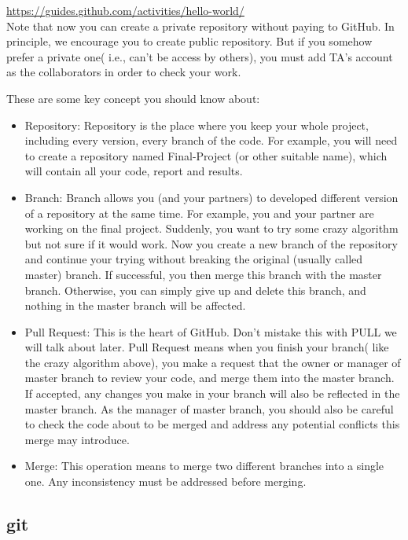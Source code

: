 \documentclass[12pt, fullpage,letterpaper]{article}
\begin{document}
\href{https://guides.github.com/activities/hello-world/}{https://guides.github.com/activities/hello-world/}\\

Note that now you can create a private repository without paying to GitHub. In principle, we encourage you to create public repository. But if you somehow prefer a private one( i.e., can't be access by others), you must add TA's account as the collaborators in order to check your work.  

These are some key concept you should know about:
\begin{itemize}
	\item Repository: Repository is the place where you keep your whole project, including every version, every branch of the code. For example, you will need to create a repository named Final-Project (or other suitable name), which will contain all your code, report and results.
	
	\item Branch: Branch allows you (and your partners) to developed different version of a repository at the same time. For example, you and your partner are working on the final project. Suddenly, you want to try some crazy algorithm but not sure if it would work. Now you create a new branch of the repository and continue your trying without breaking the original (usually called master) branch. If successful, you then merge this branch with the master branch. Otherwise, you can simply give up and delete this branch, and nothing in the master branch will be affected. 
	
	\item Pull Request: This is the heart of GitHub. Don't mistake this with PULL we will talk about later. Pull Request means when you finish your branch( like the crazy algorithm above), you make a request that the owner or manager of master branch to review your code, and merge them into the master branch. If accepted, any changes you make in your branch will also be reflected in the master branch. As the manager of master branch, you should also be careful to check the code about to be merged and address any potential conflicts this merge may introduce. 
	
	\item Merge: This operation means to merge two different branches into a single one. Any inconsistency must be addressed before merging. 
\end{itemize}

\subsection*{git}
\end{document}
